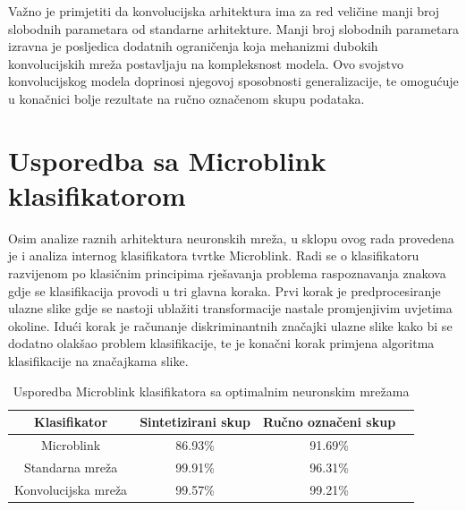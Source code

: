 \documentclass[lmodern, utf8, diplomski, numeric]{fer}
\begin{document}
Važno je primjetiti da konvolucijska arhitektura ima za red veličine manji broj slobodnih parametara od standarne arhitekture. Manji broj slobodnih parametara izravna je posljedica dodatnih ograničenja koja mehanizmi dubokih konvolucijskih mreža postavljaju na kompleksnost modela. Ovo svojstvo konvolucijskog modela doprinosi njegovoj sposobnosti generalizacije, te omogućuje u konačnici bolje rezultate na ručno označenom skupu podataka.

\section{Usporedba sa Microblink klasifikatorom}

Osim analize raznih arhitektura neuronskih mreža, u sklopu ovog rada provedena je i analiza internog klasifikatora tvrtke Microblink. Radi se o klasifikatoru razvijenom po klasičnim principima rješavanja problema raspoznavanja znakova gdje se klasifikacija provodi u tri glavna koraka. Prvi korak je predprocesiranje ulazne slike gdje se nastoji ublažiti transformacije nastale promjenjivim uvjetima okoline. Idući korak je računanje diskriminantnih značajki ulazne slike kako bi se dodatno olakšao problem klasifikacije, te je konačni korak primjena algoritma klasifikacije na značajkama slike.

\hspace{2em}
\begin{table}[ht!]
\begin{center}
\centering
    \begin{tabular}{ | c| c| c|c |}
    \hline    		
    Klasifikator & Sintetizirani skup  & Ručno označeni skup \\ \hline
    Microblink  & 86.93\% & 91.69\%  \\ \hline
    Standarna mreža & 99.91\% & 96.31\%  \\ \hline
    Konvolucijska mreža & 99.57\% &  99.21\% \\
    \hline
    \end{tabular}
\end{center}
\caption{Usporedba Microblink klasifikatora sa optimalnim neuronskim mrežama}
\label{tab:mbstandconv}
\end{table}
\end{document}

